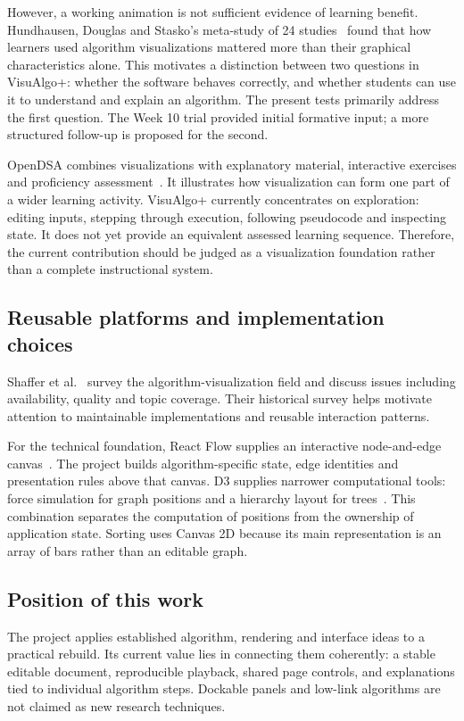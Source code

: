 \documentclass[11pt,a4paper]{article}
\begin{document}
However, a working animation is not sufficient evidence of learning benefit. Hundhausen, Douglas and Stasko's meta-study of 24 studies~\cite{hundhausen2002} found that how learners used algorithm visualizations mattered more than their graphical characteristics alone. This motivates a distinction between two questions in VisuAlgo+: whether the software behaves correctly, and whether students can use it to understand and explain an algorithm. The present tests primarily address the first question. The Week 10 trial provided initial formative input; a more structured follow-up is proposed for the second.

OpenDSA combines visualizations with explanatory material, interactive exercises and proficiency assessment~\cite{opendsa}. It illustrates how visualization can form one part of a wider learning activity. VisuAlgo+ currently concentrates on exploration: editing inputs, stepping through execution, following pseudocode and inspecting state. It does not yet provide an equivalent assessed learning sequence. Therefore, the current contribution should be judged as a visualization foundation rather than a complete instructional system.

\subsection{Reusable platforms and implementation choices}
Shaffer et al.~\cite{shaffer2010} survey the algorithm-visualization field and discuss issues including availability, quality and topic coverage. Their historical survey helps motivate attention to maintainable implementations and reusable interaction patterns.

For the technical foundation, React Flow supplies an interactive node-and-edge canvas~\cite{reactflow}. The project builds algorithm-specific state, edge identities and presentation rules above that canvas. D3 supplies narrower computational tools: force simulation for graph positions and a hierarchy layout for trees~\cite{d3}. This combination separates the computation of positions from the ownership of application state. Sorting uses Canvas 2D because its main representation is an array of bars rather than an editable graph.

\subsection{Position of this work}
The project applies established algorithm, rendering and interface ideas to a practical rebuild. Its current value lies in connecting them coherently: a stable editable document, reproducible playback, shared page controls, and explanations tied to individual algorithm steps. Dockable panels and low-link algorithms are not claimed as new research techniques.
\end{document}
